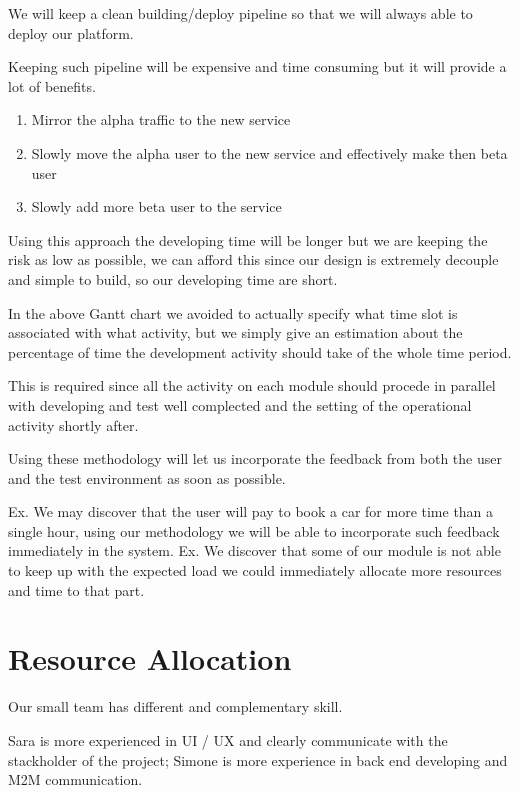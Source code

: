 \documentclass[11pt]{article} %
\begin{document}
We will keep a clean building/deploy pipeline so that we will always able to deploy our platform.

Keeping such pipeline will be expensive and time consuming but it will provide a lot of benefits.

\begin{enumerate}
	\item Mirror the alpha traffic to the new service
	\item Slowly move the alpha user to the new service and effectively make then beta user
	\item Slowly add more beta user to the service
\end{enumerate}

Using this approach the developing time will be longer but we are keeping the risk as low as possible, we can afford this since our design is extremely decouple and simple to build, so our developing time are short.



In the above Gantt chart we avoided to actually specify what time slot is associated with what activity, but we simply give an estimation about the percentage of time the development activity should take of the whole time period.

This is required since all the activity on each module should procede in parallel with developing and test well complected and the setting of the operational activity shortly after.

Using these methodology will let us incorporate the feedback from both the user and the test environment as soon as possible.

Ex. We may discover that the user will pay to book a car for more time than a single hour, using our methodology we will be able to incorporate such feedback immediately in the system.
Ex. We discover that some of our module is not able to keep up with the expected load we could immediately allocate more resources and time to that part.

\section{Resource Allocation}

Our small team has different and complementary skill.

Sara is more experienced in UI / UX and clearly communicate with the stackholder of the project; Simone is more experience in back end developing and M2M communication.
\end{document}
